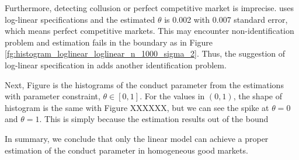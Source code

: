 \documentclass[11pt, a4paper]{article}
\begin{document}
Furthermore, detecting collusion or perfect competitive market is imprecise. 
\cite{merel2009measuring} uses log-linear specifications and the estimated $\theta$ is 0.002 with 0.007 standard error, which means perfect competitive markets. 
This may encounter non-identification problem and estimation fails in the boundary as in Figure \ref{fg:histogram_loglinear_loglinear_n_1000_sigma_2}. 
Thus, the suggestion of log-linear specification in \cite{perloff2012collinearity} adds another identification problem. 



Next, Figure %
is the histograms of the conduct parameter from the estimations with parameter constraint, $\theta \in [0,1]$.
For the values in $(0,1)$, the shape of histogram is the same with Figure XXXXXX, but we can see the spike at $\theta = 0$ and $\theta = 1$.
This is simply because the estimation results out of the bound



In summary, we conclude that only the linear model can achieve a proper estimation of the conduct parameter in homogeneous good markets. 







\end{document}
